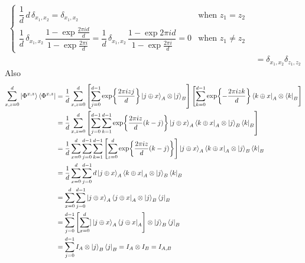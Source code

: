 \documentclass[a4paper, 11pt]{article}
\begin{document}
{\begin{align*}
\begin{cases}
		\dfrac{1}{d}\, d\,\delta_{x_1,x_2}=\delta_{x_1,x_2} & \text{when $z_1=z_2$}\\
		\dfrac{1}{d}\, \delta_{x_1,x_2}\,\dfrac{1-\exp{\frac{2\pi i d}{d}}}{1-\exp{\frac{2\pi i}{d}}}= \dfrac{1}{d}\, \delta_{x_1,x_2}\,\dfrac{1-\exp{2\pi i d}}{1-\exp{\frac{2\pi i}{d}}}=0 & \text{when $z_1\neq z_2$}
	\end{cases}\\[3mm]
	& = \delta_{x_1,x_2}\delta_{z_1,z_2}
\end{align*}Also 
\begin{align*}
\sum_{x,z=0}^d\ket{\Phi^{x,z}} 	\bra{\Phi^{x,z}} & = \frac1d \sum_{x,z=0}^d\left[ \sum_{j=0}^{d-1}\exp{\frac{2\pi izj}{d}}\ket{j\oplus x}_A\otimes \ket{j}_B \right]\left[\sum_{k=0}^{d-1}\exp{-\frac{2\pi izk}{d}}\bra{k\oplus x}_A\otimes \bra{k}_B\right]\\
& = \frac1d\sum_{x,z=0}^d\left[   \sum_{j=0}^{d-1}\sum_{k=1}^{d-1} \exp{\frac{2\pi iz}{d}(k-j)}\ket{j\oplus x}_A\bra{k\oplus x}_A\otimes\ket{j}_B\bra{k}_B   \right]\\
& = \frac1d\sum_{x=0}^d\sum_{j=0}^{d-1}\sum_{k=1}^{d-1} \left[  \sum_{z=0}^d \exp{\frac{2\pi iz}{d}(k-j)} \right]\ket{j\oplus x}_A\bra{k\oplus x}_A\otimes\ket{j}_B\bra{k}_B  \\
& = \frac1d\sum_{x=0}^d\sum_{j=0}^{d-1} d\ket{j\oplus x}_A\bra{k\oplus x}_A\otimes\ket{j}_B\bra{k}_B \\
& =  \sum_{x=0}^d\sum_{j=0}^{d-1} \ket{j\oplus x}_A\bra{j\oplus x}_A\otimes\ket{j}_B\bra{j}_B\\
& = \sum_{j=0}^{d-1} \left[ \sum_{x=0}^d]\ket{j\oplus x}_A\bra{j\oplus x}_A\right]\otimes\ket{j}_B\bra{j}_B\\
& = \sum_{j=0}^{d-1} I_A\otimes\ket{j}_B\bra{j}_B= I_A\otimes I_B=I_{A,B}
\end{align*}
}

\end{document}
